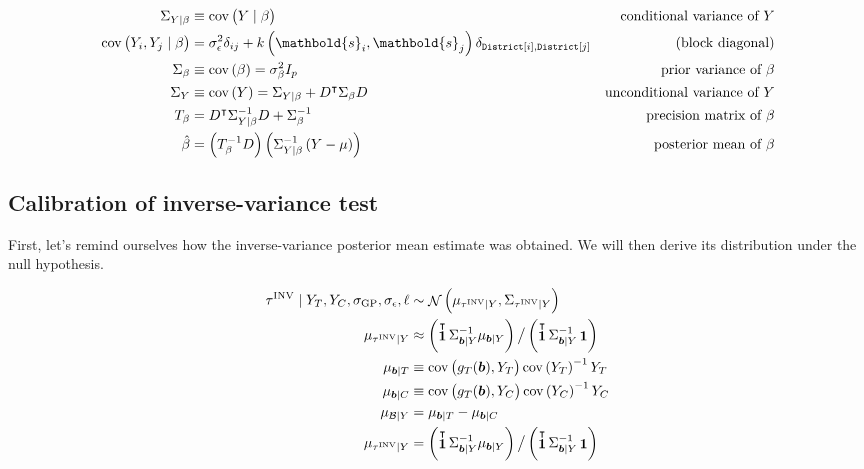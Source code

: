 \documentclass[letter]{article}
\DeclareMathOperator{\cov}{{cov}}
\DeclareMathOperator{\normal}{\mathcal{N}}
\DeclareMathOperator{\ones}{\mathbf{1}}
\newcommand{\district}{\mathtt{District}}
\newcommand{\trans}{^{\intercal}}
\newcommand{\sigmaf}{\sigma_{\mathrm{GP}}}
\newcommand{\sigman}{\sigma_{\epsilon}}
\newcommand{\svec}{\mathbold{s}}
\newcommand{\boundary}{\mathcal{B}}
\newcommand{\sentinels}{\bm{b}}
\newcommand{\invvar}{\tau^{\mathrm{INV}}}
\begin{document}
\begin{equation}
\begin{aligned}
    \Sigma_{Y \mid \beta} &\equiv \cov\del{Y \mid \beta } 
        & \text{conditional variance of $Y$} \\
    \cov\del{Y_i , Y_j \mid \beta } &= \sigman^2 \delta_{ij} + k\del{\svec_i,\svec_j} \delta_{\district\sbr{i},\district\sbr{j}} & \text{(block diagonal)}\\
    \Sigma_\beta &\equiv \cov\del{\beta} = \sigma_\beta^2 I_p
        & \text{prior variance of $\beta$} \\
    \Sigma_Y &\equiv \cov\del{Y} = \Sigma_{Y \mid \beta} + D\trans \Sigma_\beta D
        & \text{unconditional variance of $Y$} \\
    T_\beta &= D\trans \Sigma_{Y \mid \beta}^{-1} D + \Sigma^{-1}_\beta 
        & \text{precision matrix of $\beta$} \\
    \hat\beta &= \del{T_\beta^{-1} D} \del{ \Sigma_{Y \mid \beta}^{-1} \del{Y-\mu}}
        & \text{posterior mean of $\beta$}
\end{aligned}
\end{equation}
    


    	\subsection{Calibration of inverse-variance test}\label{calibration-of-inverse-variance-test}

First, let's remind ourselves how the inverse-variance posterior mean estimate was obtained. We will then derive its distribution under the null hypothesis.

\begin{equation}\begin{split}
    \invvar \mid Y_T, Y_C, \sigmaf, \sigman, \ell &\sim \normal\del{\mu_{\invvar \mid Y}, \Sigma_{\invvar \mid Y}} \\
    \mu_{\invvar \mid Y} &\approx \del{\ones\trans \Sigma_{\sentinels \mid Y}^{-1} \mu_{\sentinels \mid Y}} \big/ \del{\ones\trans \Sigma_{\sentinels \mid Y}^{-1} \ones}  \\
    \mu_{\sentinels \mid T} &\equiv \cov\del{g_T(\sentinels), Y_T} \cov\del{Y_T}^{-1}  Y_T \\
    \mu_{\sentinels \mid C} &\equiv \cov\del{g_T(\sentinels), Y_C} \cov\del{Y_C}^{-1}  Y_C \\
    \mu_{\boundary \mid Y} &=  \mu_{\sentinels \mid T} - \mu_{\sentinels \mid C} \\
    \mu_{\invvar \mid Y} &= \del{\ones\trans \Sigma_{\sentinels \mid Y}^{-1} \mu_{\sentinels \mid Y}} \big/ \del{\ones\trans \Sigma_{\sentinels \mid Y}^{-1} \ones}  \\
\end{split}\end{equation}
    
\end{document}
